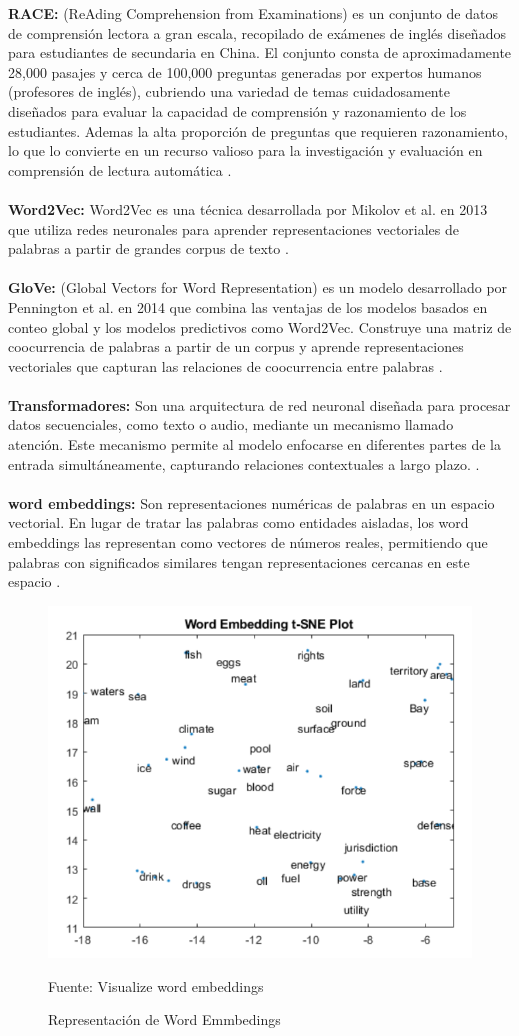 \textbf{RACE: } (ReAding Comprehension from Examinations) es un conjunto de datos de comprensión lectora a gran escala, recopilado de exámenes de inglés diseñados para estudiantes de secundaria en China. El conjunto consta de aproximadamente 28,000 pasajes y cerca de 100,000 preguntas generadas por expertos humanos (profesores de inglés), cubriendo una variedad de temas cuidadosamente diseñados para evaluar la capacidad de comprensión y razonamiento de los estudiantes. Ademas la alta proporción de preguntas que requieren razonamiento, lo que lo convierte en un recurso valioso para la investigación y evaluación en comprensión de lectura automática \cite{Lai2017}.
\\
\\
\textbf{Word2Vec: } Word2Vec es una técnica desarrollada por Mikolov et al. en 2013 que utiliza redes neuronales para aprender representaciones vectoriales de palabras a partir de grandes corpus de texto \cite{mikolov2013}.
\\
\\
\textbf{GloVe: } (Global Vectors for Word Representation) es un modelo desarrollado por Pennington et al. en 2014 que combina las ventajas de los modelos basados en conteo global y los modelos predictivos como Word2Vec. Construye una matriz de coocurrencia de palabras a partir de un corpus y aprende representaciones vectoriales que capturan las relaciones de coocurrencia entre palabras \cite{Pennington2014}.
\\
\\
\newpage
\textbf{Transformadores: } Son una arquitectura de red neuronal diseñada para procesar datos secuenciales, como texto o audio, mediante un mecanismo llamado atención. Este mecanismo permite al modelo enfocarse en diferentes partes de la entrada simultáneamente, capturando relaciones contextuales a largo plazo. \cite{vaswani2023attentionneed}.
\\
\\
\textbf{word embeddings:} Son representaciones numéricas de palabras en un espacio vectorial. En lugar de tratar las palabras como entidades aisladas, los word embeddings las representan como vectores de números reales, permitiendo que palabras con significados similares tengan representaciones cercanas en este espacio \cite{wordembeddingssurvey}.

\begin{figure}[h]
  \centering
  \includegraphics[width=0.5\linewidth]{Imagenes/word emmbedings.png}
  \caption{Representación de Word Emmbedings}
  Fuente: Visualize word embeddings \cite{mathworks1}
  \label{fig:word_emmbedings}
\end{figure}


